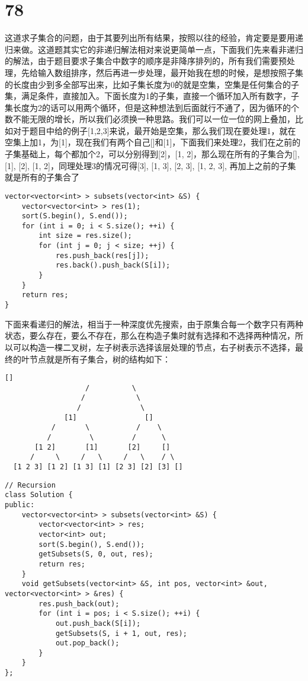 \documentclass[12pt,a4paper]{article}
\begin{document}
\section{78}
\begin{CJK}{UTF8}{gbsn}
这道求子集合的问题，由于其要列出所有结果，按照以往的经验，肯定要是要用递归来做。这道题其实它的非递归解法相对来说更简单一点，下面我们先来看非递归的解法，由于题目要求子集合中数字的顺序是非降序排列的，所有我们需要预处理，先给输入数组排序，然后再进一步处理，最开始我在想的时候，是想按照子集的长度由少到多全部写出来，比如子集长度为0的就是空集，空集是任何集合的子集，满足条件，直接加入。下面长度为1的子集，直接一个循环加入所有数字，子集长度为2的话可以用两个循环，但是这种想法到后面就行不通了，因为循环的个数不能无限的增长，所以我们必须换一种思路。我们可以一位一位的网上叠加，比如对于题目中给的例子[1,2,3]来说，最开始是空集，那么我们现在要处理1，就在空集上加1，为[1]，现在我们有两个自己[]和[1]，下面我们来处理2，我们在之前的子集基础上，每个都加个2，可以分别得到[2]，[1, 2]，那么现在所有的子集合为[], [1], [2], [1, 2]，同理处理3的情况可得[3], [1, 3], [2, 3], [1, 2, 3], 再加上之前的子集就是所有的子集合了
\end{CJK}
\begin{lstlisting}
vector<vector<int> > subsets(vector<int> &S) {
	vector<vector<int> > res(1);
	sort(S.begin(), S.end());
	for (int i = 0; i < S.size(); ++i) {
		int size = res.size();
		for (int j = 0; j < size; ++j) {
			res.push_back(res[j]);
			res.back().push_back(S[i]);
		}
	}
	return res;
}
\end{lstlisting}
\begin{CJK}{UTF8}{gbsn}
下面来看递归的解法，相当于一种深度优先搜索，由于原集合每一个数字只有两种状态，要么存在，要么不存在，那么在构造子集时就有选择和不选择两种情况，所以可以构造一棵二叉树，左子树表示选择该层处理的节点，右子树表示不选择，最终的叶节点就是所有子集合，树的结构如下：
\end{CJK}
\begin{lstlisting}
[]        
                   /          \        
                  /            \     
                 /              \
              [1]                []
           /       \           /    \
          /         \         /      \        
       [1 2]       [1]       [2]     []
      /     \     /   \     /   \    / \
  [1 2 3] [1 2] [1 3] [1] [2 3] [2] [3] []
\end{lstlisting}
\begin{lstlisting}
// Recursion
class Solution {
public:
	vector<vector<int> > subsets(vector<int> &S) {
		vector<vector<int> > res;
		vector<int> out;
		sort(S.begin(), S.end());
		getSubsets(S, 0, out, res);
		return res;
	}
	void getSubsets(vector<int> &S, int pos, vector<int> &out, vector<vector<int> > &res) {
		res.push_back(out);
		for (int i = pos; i < S.size(); ++i) {
			out.push_back(S[i]);
			getSubsets(S, i + 1, out, res);
			out.pop_back();
		}
	}
};
\end{lstlisting}
\end{document}
